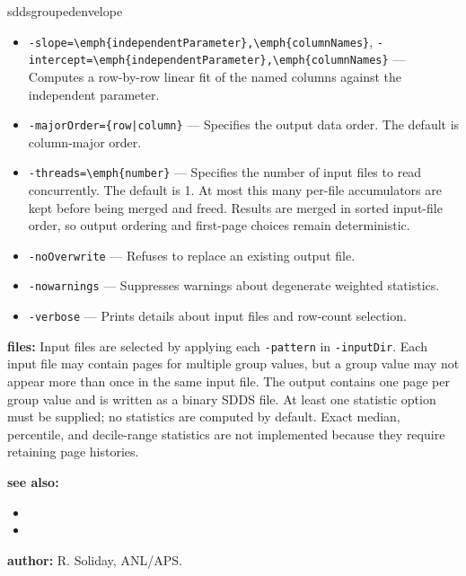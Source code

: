 \begin{sddsprog}{sddsgroupedenvelope}
\begin{itemize}
    \item \verb|-slope=\emph{independentParameter},\emph{columnNames}|, \verb|-intercept=\emph{independentParameter},\emph{columnNames}| --- Computes a row-by-row linear fit of the named columns against the independent parameter.
    \item \verb!-majorOrder={row|column}! --- Specifies the output data order. The default is column-major order.
    \item \verb|-threads=\emph{number}| --- Specifies the number of input files to read concurrently. The default is 1. At most this many per-file accumulators are kept before being merged and freed. Results are merged in sorted input-file order, so output ordering and first-page choices remain deterministic.
    \item \verb|-noOverwrite| --- Refuses to replace an existing output file.
    \item \verb|-nowarnings| --- Suppresses warnings about degenerate weighted statistics.
    \item \verb|-verbose| --- Prints details about input files and row-count selection.
  \end{itemize}
  \item \textbf{files:} Input files are selected by applying each \verb|-pattern| in \verb|-inputDir|. Each input file may contain pages for multiple group values, but a group value may not appear more than once in the same input file. The output contains one page per group value and is written as a binary SDDS file. At least one statistic option must be supplied; no statistics are computed by default. Exact median, percentile, and decile-range statistics are not implemented because they require retaining page histories.
  \item \textbf{see also:}
  \begin{itemize}
    \item {}
    \item {}
  \end{itemize}
  \item \textbf{author:} R. Soliday, ANL/APS.
\end{sddsprog}

